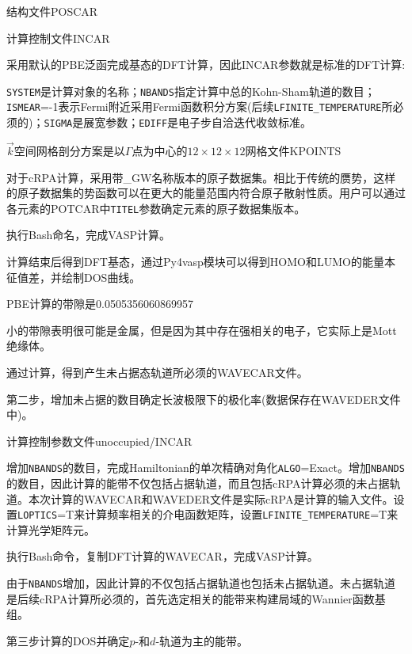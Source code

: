 结构文件\textrm{POSCAR}

计算控制文件\textrm{INCAR}

采用默认的\textrm{PBE}泛函完成基态的\textrm{DFT}计算，因此\textrm{INCAR}参数就是标准的\textrm{DFT}计算:

\texttt{SYSTEM}是计算对象的名称；\texttt{NBANDS}指定计算中总的\textrm{Kohn-Sham}轨道的数目；\texttt{ISMEAR}=-1表示\textrm{Fermi}附近采用\textrm{Fermi}函数积分方案(后续\texttt{LFINITE\_TEMPERATURE}所必须的)；\texttt{SIGMA}是展宽参数；\texttt{EDIFF}是电子步自洽迭代收敛标准。

$\vec k$空间网格剖分方案是以$\Gamma$点为中心的$12\times12\times12$网格文件\textrm{KPOINTS}

对于\textrm{cRPA}计算，采用带\textrm{\_GW}名称版本的原子数据集。相比于传统的赝势，这样的原子数据集的势函数可以在更大的能量范围内符合原子散射性质。用户可以通过各元素的\textrm{POTCAR}中\texttt{TITEL}参数确定元素的原子数据集版本。

执行\textrm{Bash}命名，完成\textrm{VASP}计算。

计算结束后得到\textrm{DFT}基态，通过\textrm{Py4vasp}模块可以得到\textrm{HOMO}和\textrm{LUMO}的能量本征值差，并绘制\textrm{DOS}曲线。

\textrm{PBE}计算的带隙是\textrm{0.0505356060869957}

小的带隙表明很可能是金属，但是因为其中存在强相关的电子，它实际上是\textrm{Mott}绝缘体。

通过计算，得到产生未占据态轨道所必须的\textrm{WAVECAR}文件。

第二步，增加未占据的数目确定长波极限下的极化率(数据保存在\textrm{WAVEDER}文件中)。

计算控制参数文件\textrm{unoccupied/INCAR}

增加\texttt{NBANDS}的数目，完成\textrm{Hamiltonian}的单次精确对角化\textrm{\texttt{ALGO}=Exact}。增加\texttt{NBANDS}的数目，因此计算的能带不仅包括占据轨道，而且包括\textrm{cRPA}计算必须的未占据轨道。本次计算的\textrm{WAVECAR}和\textrm{WAVEDER}文件是实际\textrm{cRPA}是计算的输入文件。设置\texttt{LOPTICS}=\textrm{T}来计算频率相关的介电函数矩阵，设置\texttt{LFINITE\_TEMPERATURE}=\textrm{T}来计算光学矩阵元。

执行\textrm{Bash}命令，复制\textrm{DFT}计算的\textrm{WAVECAR}，完成\textrm{VASP}计算。

由于\texttt{NBANDS}增加，因此计算的不仅包括占据轨道也包括未占据轨道。未占据轨道是后续\textrm{cRPA}计算所必须的，首先选定相关的能带来构建局域的\textrm{Wannier}函数基组。

第三步计算的\textrm{DOS}并确定$p$-和$d$-轨道为主的能带。

